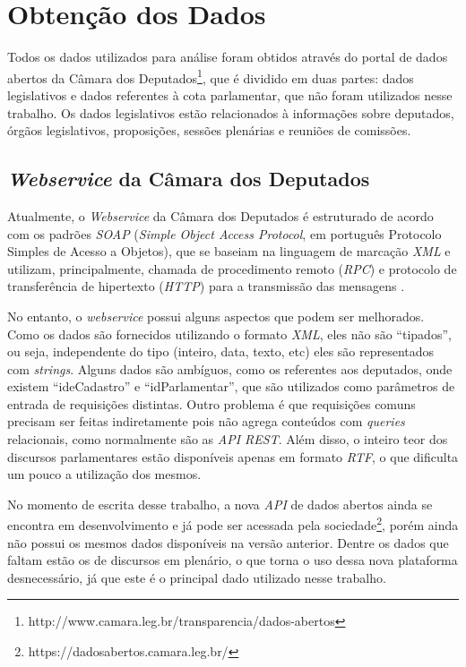 \section{Obtenção dos Dados}
\label{obtencao-dados}

Todos os dados utilizados para análise foram obtidos através do portal de dados abertos da Câmara dos Deputados\footnote{http://www.camara.leg.br/transparencia/dados-abertos}, que é dividido em duas partes: dados legislativos e dados referentes à cota parlamentar, que não foram utilizados nesse trabalho. Os dados legislativos estão relacionados à informações sobre deputados, órgãos legislativos, proposições, sessões plenárias e reuniões de comissões.

\subsection{\textit{Webservice} da Câmara dos Deputados}

Atualmente, o \textit{Webservice} da Câmara dos Deputados é estruturado de acordo com os padrões \textit{SOAP} (\textit{Simple Object Access Protocol}, em português Protocolo Simples de Acesso a Objetos), que se baseiam na linguagem de marcação \textit{XML} e utilizam, principalmente, chamada de procedimento remoto (\textit{RPC}) e protocolo de transferência de hipertexto (\textit{HTTP}) para a transmissão das mensagens \cite{soap2007}.


No entanto, o \textit{webservice} possui alguns aspectos que podem ser melhorados. Como os dados são fornecidos utilizando o formato \textit{XML}, eles não são ``tipados'', ou seja, independente do tipo (inteiro, data, texto, etc) eles são representados com \textit{strings}. Alguns dados são ambíguos, como os referentes aos deputados, onde existem ``ideCadastro'' e ``idParlamentar'', que são utilizados como parâmetros de entrada de requisições distintas. Outro problema é que requisições comuns precisam ser feitas indiretamente pois não agrega conteúdos com \textit{queries} relacionais, como normalmente são as \textit{API REST}. Além disso, o inteiro teor dos discursos parlamentares estão disponíveis apenas em formato \textit{RTF}, o que dificulta um pouco a utilização dos mesmos.

No momento de escrita desse trabalho, a nova \textit{API} de dados abertos ainda se encontra em desenvolvimento e já pode ser acessada pela sociedade\footnote{https://dadosabertos.camara.leg.br/}, porém ainda não possui os mesmos dados disponíveis na versão anterior. Dentre os dados que faltam estão os de discursos em plenário, o que torna o uso dessa nova plataforma desnecessário, já que este é o principal dado utilizado nesse trabalho.

